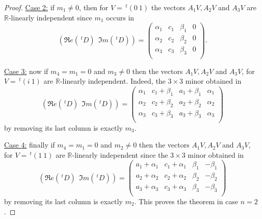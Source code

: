 \documentclass[12pt]{amsart}
\newcommand{\R}{\mathbb R}
\newcommand{\transp}{\,^t}
\theoremstyle{remark}
\theoremstyle{example}
\theoremstyle{definition}
\numberwithin{equation}{section}
\begin{document}
\begin{proof}
\noindent \underline{Case 2:} if $m_1\neq 0$, then for $V=\transp (0 \  1)$ the vectors $A_1V,A_2V$ and $A_3V$ are $\R$-linearly independent since $m_1$ occurs in  
$$(\Re e (\transp D) \ \ \Im m  (\transp D))=
\begin{pmatrix} 
\alpha_1 & c_1  & \beta_1 & 0 \\ 
\alpha_2  & c_2 & \beta_2  & 0 \\ 
 \alpha_3  & c_3 & \beta_3& 0 \\ 

\end{pmatrix}.$$ 

\noindent \underline{Case 3:} now if $m_4=m_1=0$ and $m_3\neq 0$ then the vectors $A_1V,A_2V$ and $A_3V$, for $V=\transp (i \  1)$ are $\R$-linearly independent.  Indeed, the $3\times 3$ minor obtained in 
 $$(\Re e (\transp D) \ \ \Im m  (\transp D))=
\begin{pmatrix} 
\alpha_1 & c_1+\beta_1  & a_1+\beta_1 & \alpha_1 \\ 
\alpha_2  & c_2+\beta_2& a_2+\beta_2   & \alpha_2 \\ 
 \alpha_3  &c_3+\beta_3 & a_3+\beta_3 & \alpha_3 \\ 
\end{pmatrix} $$ 
 by removing its last column is exactly $m_3$.  

\noindent \underline{Case 4:} finally if $m_4=m_1=0$ and $m_2\neq 0$ then the vectors $A_1V,A_2V$ and $A_3V$, for $V=\transp (1 \  1)$ are $\R$-linearly independent since  the $3\times 3$ minor obtained in 
 $$(\Re e (\transp D) \ \ \Im m  (\transp D))=
\begin{pmatrix} 
a_1+\alpha_1 &  c_1+ \alpha_1 & \beta_1  &  -\beta_1 \\ 
a_2+\alpha_2 &  c_2+ \alpha_2  & \beta_2& -\beta_2 \\ 
a_3+\alpha_3 &   c_3+ \alpha_3  &\beta_3 & -\beta_3 \\ 
\end{pmatrix} $$ 
by removing its last column is exactly $m_2$. This proves the theorem in case $n=2$.    
         
\vspace{0.5cm}         
         


\end{proof}
\end{document}
